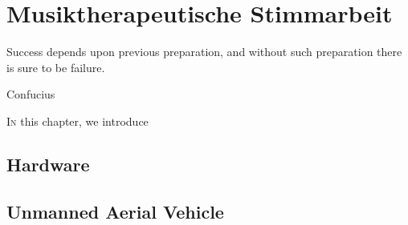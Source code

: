 
\chapter{Musiktherapeutische Stimmarbeit}
\label{chapter:musiktherapeutische_stimmarbeit}
\setlength{\epigraphwidth}{8.0cm}
\epigraph{Success depends upon previous preparation, and without such preparation there is sure to be failure.}{Confucius}
\ifpdf
    \graphicspath{{3_experimental_platform/figures/PNG/}{3_musiktherapeutische_stimmarbeit/figures/PDF/}{3_musiktherapeutische_stimmarbeit/figures/}}
\else
    \graphicspath{{3_musiktherapeutische_stimmarbeit/figures/EPS/}{3_musiktherapeutische_stimmarbeit/figures/}}
\fi
\lettrine{I}{n} this chapter, we introduce 



\section{Hardware}
\label{section_experimental_platform_hardware}

\section{Unmanned Aerial Vehicle}
\label{section_experimental_platform_hardware_uav}



